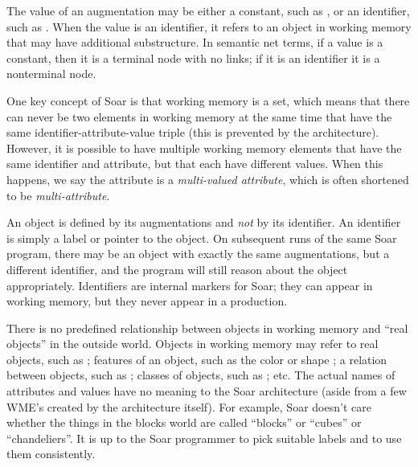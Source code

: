 The value of an augmentation may be either a constant, such as , or
an identifier, such as . When the value is an identifier, it refers
to an object in working memory that may have additional substructure. In
semantic net terms, if a value is a constant, then it is a terminal node with
no links; if it is an identifier it is a nonterminal node.

One key concept of Soar is that working memory is a set, which means that there can never be two elements in
working memory at the same time that have the same identifier-attribute-value
triple (this is prevented by the architecture). However, it is possible to have
multiple working memory elements that have the same identifier and attribute,
but that each have different values.  When this happens, we say the attribute
is a \emph{multi-valued attribute}, which is often shortened to be
\emph{multi-attribute}.

An object is defined by its augmentations and
\emph{not} by its identifier. An identifier is simply a label or pointer to the object. On subsequent runs of the same Soar program,
there may be an object with exactly the same augmentations, but a different
identifier, and the program will still reason about the object
appropriately. Identifiers are internal markers for Soar; they can appear
in working memory, but they never appear in a production.

There is no predefined relationship between objects in working memory and
``real objects'' in the outside world.  Objects in working memory may refer to
real objects, such as ; features of an object, such as the
color  or shape ; a relation between objects, such as ; classes of
objects, such as ; etc. The actual names of attributes and
values have no meaning to the Soar architecture (aside from a few WME's
created by the architecture itself). For example, Soar doesn't care whether
the things in the blocks world are called ``blocks'' or ``cubes'' or
``chandeliers''. It is up to the Soar programmer to pick suitable labels and to
use them consistently.

